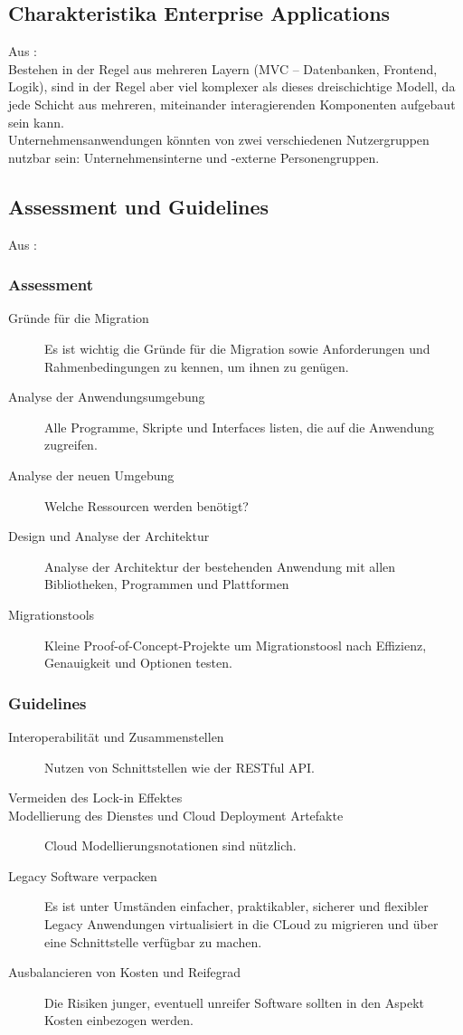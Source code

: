 \subsection{Charakteristika Enterprise Applications}
Aus :\\
Bestehen in der Regel aus mehreren Layern (MVC -- Datenbanken, Frontend, 
Logik), sind in der Regel aber viel komplexer als dieses dreischichtige Modell, 
da jede Schicht aus mehreren, miteinander interagierenden Komponenten aufgebaut 
sein kann. \\
Unternehmensanwendungen könnten von zwei verschiedenen Nutzergruppen nutzbar 
sein: Unternehmensinterne und -externe Personengruppen.

\subsection{Assessment und Guidelines}
Aus : \\
\subsubsection{Assessment}
\begin{description}
	\item[Gründe für die Migration] Es ist wichtig die Gründe für die 
Migration sowie Anforderungen und Rahmenbedingungen zu kennen, um ihnen zu 
genügen. 
	\item[Analyse der Anwendungsumgebung] Alle Programme, Skripte und 
Interfaces listen, die auf die Anwendung zugreifen.
	\item[Analyse der neuen Umgebung] Welche Ressourcen werden benötigt?
	\item[Design und Analyse der Architektur] Analyse der Architektur der 
bestehenden Anwendung mit allen Bibliotheken, Programmen und Plattformen 
	\item[Migrationstools] Kleine Proof-of-Concept-Projekte um 
Migrationstoosl nach Effizienz, Genauigkeit und Optionen testen.
\end{description}
\subsubsection{Guidelines} 
\begin{description}
	\item[Interoperabilität und Zusammenstellen] Nutzen von Schnittstellen 
wie der RESTful API.
	\item[Vermeiden des Lock-in Effektes]
	\item[Modellierung des Dienstes und Cloud Deployment Artefakte] Cloud 
Modellierungsnotationen sind nützlich. 
	\item[Legacy Software verpacken] Es ist unter Umständen einfacher, 
praktikabler, sicherer und flexibler Legacy Anwendungen virtualisiert in die 
CLoud zu migrieren und über eine Schnittstelle verfügbar zu machen.
	\item[Ausbalancieren von Kosten und Reifegrad] Die Risiken junger, 
eventuell unreifer Software sollten in den Aspekt Kosten einbezogen werden.
\end{description}




